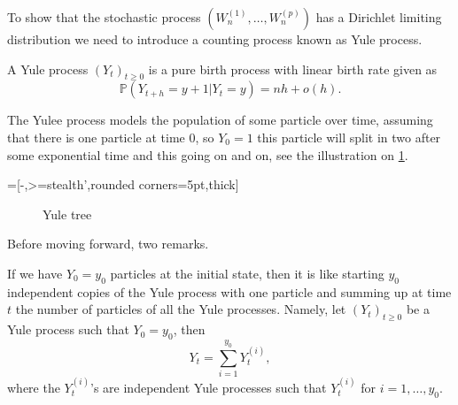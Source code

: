 To show that the stochastic process $(W_n^{(1)},\ldots, W_n^{(p)})$ has a Dirichlet limiting distribution we need to introduce a counting process known as Yule process.
\begin{definition}\label{def:yule_process}
A Yule process $(Y_t)_{t\geq0}$ is a pure birth process with linear birth rate given as 
\[
\mathbb{P}(Y_{t+h} = y+1|Y_{t} =y) = nh+o(h).
\] 
\end{definition}
The Yulee process models the population of some particle over time, assuming that there is one particle at time $0$, so $Y_0=1$ this particle will split in two after some exponential time and this going on and on, see the illustration on \cref{fig:yule_tree}. 

=[-,>=stealth',rounded corners=5pt,thick]  
\begin{figure}[!ht]
\begin{center}
\caption{Yule tree}
\label{fig:yule_tree}
\end{center}
\end{figure}
Before moving forward, two remarks.
\begin{remark}\label{rem:yule_process_initial}
If we have $Y_0 = y_0$ particles at the initial state, then it is like starting $y_0$ independent copies of the Yule process with one particle and summing up at time $t$ the number of particles of all the Yule processes. Namely, let $(Y_t)_{t\geq0}$ be a Yule process such that $Y_0 = y_0$, then
$$
Y_t = \sum_{i = 1}^{y_0}Y_t^{(i)},
$$   
where the $Y_t^{(i)}$'s are independent Yule processes such that $Y_t^{(i)}$ for $i = 1,\ldots, y_0$.
\end{remark}
